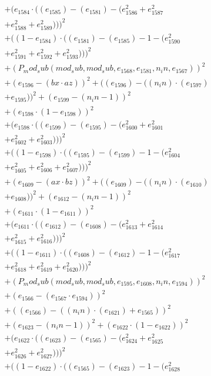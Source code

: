 \documentclass[10pt, a4paper]{article}
\begin{document}
\begin{small}
\begin{align*}
& + (e_{1584}  \cdot  ((e_{1585}) - (e_{1581}) - (e_{1586}^{2} + e_{1587}^{2} \\
& + e_{1588}^{2} + e_{1589}^{2})))^{2} \\
& + ((1 - e_{1584})  \cdot  ((e_{1581}) - (e_{1585}) - 1 - (e_{1590}^{2} \\
& + e_{1591}^{2} + e_{1592}^{2} + e_{1593}^{2})))^{2} \\
& + (P_mod_sub(mod_sub, mod_sub, e_{1568}, e_{1581}, n_in, e_{1567}))^{2} \\
& + (e_{1596} - (bx  \cdot  az))^{2} + ((e_{1596}) - ((n_in)  \cdot  (e_{1597}) \\
& + e_{1595}))^{2} + (e_{1599} - (n_in - 1))^{2} \\
& + (e_{1598}  \cdot  (1 - e_{1598}))^{2} \\
& + (e_{1598}  \cdot  ((e_{1599}) - (e_{1595}) - (e_{1600}^{2} + e_{1601}^{2} \\
& + e_{1602}^{2} + e_{1603}^{2})))^{2} \\
& + ((1 - e_{1598})  \cdot  ((e_{1595}) - (e_{1599}) - 1 - (e_{1604}^{2} \\
& + e_{1605}^{2} + e_{1606}^{2} + e_{1607}^{2})))^{2} \\
& + (e_{1609} - (ax  \cdot  bz))^{2} + ((e_{1609}) - ((n_in)  \cdot  (e_{1610}) \\
& + e_{1608}))^{2} + (e_{1612} - (n_in - 1))^{2} \\
& + (e_{1611}  \cdot  (1 - e_{1611}))^{2} \\
& + (e_{1611}  \cdot  ((e_{1612}) - (e_{1608}) - (e_{1613}^{2} + e_{1614}^{2} \\
& + e_{1615}^{2} + e_{1616}^{2})))^{2} \\
& + ((1 - e_{1611})  \cdot  ((e_{1608}) - (e_{1612}) - 1 - (e_{1617}^{2} \\
& + e_{1618}^{2} + e_{1619}^{2} + e_{1620}^{2})))^{2} \\
& + (P_mod_sub(mod_sub, mod_sub, e_{1595}, e_{1608}, n_in, e_{1594}))^{2} \\
& + (e_{1566} - (e_{1567}  \cdot  e_{1594}))^{2} \\
& + ((e_{1566}) - ((n_in)  \cdot  (e_{1621}) + e_{1565}))^{2} \\
& + (e_{1623} - (n_in - 1))^{2} + (e_{1622}  \cdot  (1 - e_{1622}))^{2} \\
& + (e_{1622}  \cdot  ((e_{1623}) - (e_{1565}) - (e_{1624}^{2} + e_{1625}^{2} \\
& + e_{1626}^{2} + e_{1627}^{2})))^{2} \\
& + ((1 - e_{1622})  \cdot  ((e_{1565}) - (e_{1623}) - 1 - (e_{1628}^{2} \\

\end{align*}
\end{small}
\end{document}

